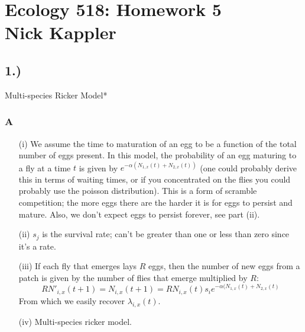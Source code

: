 \documentclass[11pt]{amsart}
\begin{document}
\sffamily
\section*{Ecology 518: Homework 5\\ Nick Kappler}
\subsection*{1.)} Multi-species Ricker Model*

\subsubsection*{A}
\begin{itemize}
\item [(i)] We assume the time to maturation of an egg to be a function of the total number of eggs present.  In this model, the probability of an egg maturing to a fly at a time $t$ is given by $e^{-\alpha (N_{1,x}(t)+N_{2,x}(t))}$ (one could probably derive this in terms of waiting times, or if you concentrated on the flies you could probably use the poisson distribution).  This is a form of scramble competition; the more eggs there are the harder it is for eggs to persist and mature.  Also, we don't expect eggs to persist forever, see part (ii).  


\item [(ii)] $s_j$ is the survival rate; can't be greater than one or less than zero since it's a rate.

\item [(iii)]  If each fly that emerges lays $R$ eggs, then the number of new eggs from a patch is given by the number of flies that emerge multiplied by $R$:
\[
RN'_{i,x}(t+1) = N_{i,x}(t+1) = RN_{i,x}(t)s_ie^{-\alpha(N_{1,x}(t) + N_{2,x}(t)}
\]
From which we easily recover $\lambda_{i,x}(t)$.

\item [(iv)]  Multi-species ricker model.

\end{itemize}
\end{document}
